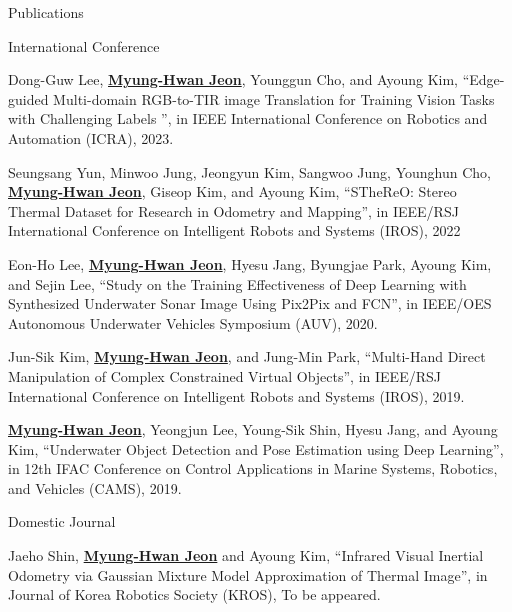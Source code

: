 \begin{rSection}{Publications}
\begin{pubSubsection}{International Conference}


  \item Dong-Guw Lee, \underline{\textbf{Myung-Hwan Jeon}}, Younggun Cho, and Ayoung Kim, “Edge-guided Multi-domain RGB-to-TIR image Translation for Training Vision Tasks with Challenging Labels ”, in IEEE International Conference on Robotics and Automation (ICRA), 2023.

  \item Seungsang Yun, Minwoo Jung, Jeongyun Kim, Sangwoo Jung, Younghun Cho, \underline{\textbf{Myung-Hwan Jeon}}, Giseop Kim, and Ayoung Kim, “STheReO: Stereo Thermal Dataset for Research in Odometry and Mapping”, in IEEE/RSJ International Conference on Intelligent Robots and Systems (IROS), 2022
  
  \item Eon-Ho Lee, \underline{\textbf{Myung-Hwan Jeon}}, Hyesu Jang, Byungjae Park, Ayoung Kim, and Sejin Lee, “Study on the Training Effectiveness of Deep Learning with Synthesized Underwater Sonar Image Using Pix2Pix and FCN”, in IEEE/OES Autonomous Underwater Vehicles Symposium (AUV), 2020.
  
  \item Jun-Sik Kim, \underline{\textbf{Myung-Hwan Jeon}}, and Jung-Min Park, “Multi-Hand Direct Manipulation of Complex Constrained Virtual Objects”, in IEEE/RSJ International Conference on Intelligent Robots and Systems (IROS), 2019.
  
  \item \underline{\textbf{Myung-Hwan Jeon}}, Yeongjun Lee, Young-Sik Shin, Hyesu Jang, and Ayoung Kim, “Underwater Object Detection and Pose Estimation using Deep Learning”, in 12th IFAC Conference on Control Applications in Marine Systems, Robotics, and Vehicles (CAMS), 2019.

\end{pubSubsection}

\begin{pubSubsection}{Domestic Journal}

  \item Jaeho Shin, \underline{\textbf{Myung-Hwan Jeon}} and Ayoung Kim, “Infrared Visual Inertial Odometry via Gaussian Mixture Model Approximation of Thermal Image”, in Journal of Korea Robotics Society (KROS), To be appeared.
  

\end{pubSubsection}
\end{rSection}
